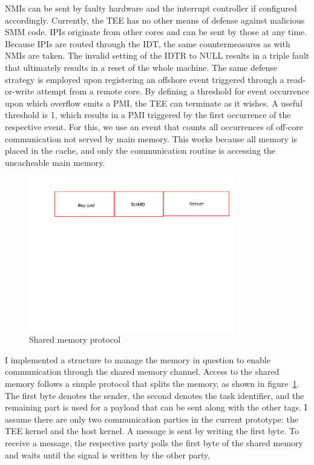 NMIs can be sent by faulty hardware and the interrupt controller if configured
accordingly. Currently, the TEE has no other means of defense against malicious
SMM code. IPIs originate from other cores and can be sent by those at any time.
Because IPIs are routed through the IDT, the same countermeasures as with NMIs
are taken. The invalid setting of the IDTR to NULL results in a triple fault
that ultimately results in a reset of the whole machine. The same defense
strategy is employed upon registering an offshore event triggered through a
read-or-write attempt from a remote core. By defining a threshold for event
occurrence upon which overflow emits a PMI, the TEE can terminate as it wishes.
A useful threshold is 1, which results in a PMI triggered by the first
occurrence of the respective event. For this, we use an event that counts all
occurrences of off-core communication not served by main memory. This works
because all memory is placed in the cache, and only the communication routine is
accessing the uncacheable main memory. \\

\begin{center}
    \begin{figure}
        \includegraphics[width=0.8\textwidth]{images/shared_mem_placeholder.png}
        \caption{Shared memory protocol}
        \label{fig:shared-mem}
    \end{figure}
\end{center}

I implemented a structure to manage the memory in question to enable
communication through the shared memory channel. Access to the shared memory
follows a simple protocol that splits the memory, as shown in
figure~\ref{fig:shared-mem}. The first byte denotes the sender, the second
denotes the task identifier, and the remaining part is used for a payload that
can be sent along with the other tags. I assume there are only two communication
parties in the current prototype: the TEE kernel and the host kernel. A message
is sent by writing the first byte. To receive a message, the respective party
polls the first byte of the shared memory and waits until the signal is written
by the other party, \\

